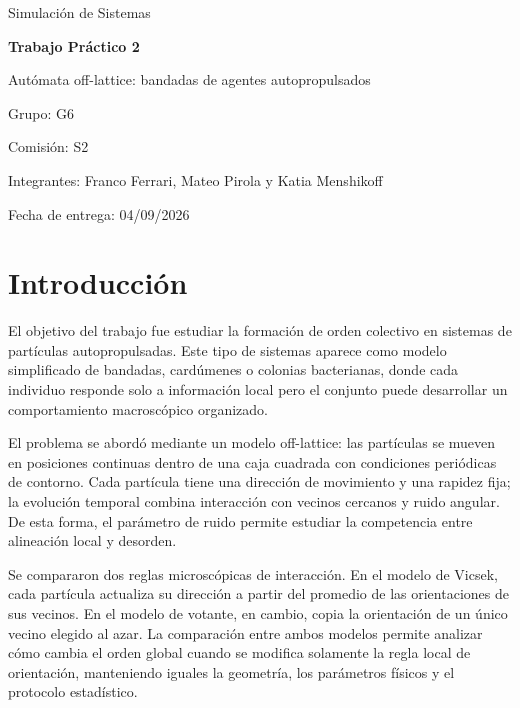 \documentclass[11pt,a4paper]{article}
\begin{document}
\begin{titlepage}
\centering
\vspace*{2cm}
{\Large Simulación de Sistemas\par}
\vspace{0.5cm}
{\LARGE\bfseries Trabajo Práctico 2\par}
\vspace{0.3cm}
{\large Autómata off-lattice: bandadas de agentes autopropulsados\par}
\vspace{2cm}
{\large
Grupo: G6\par
Comisión: S2\par
Integrantes: Franco Ferrari, Mateo Pirola y Katia Menshikoff\par
Fecha de entrega: 04/09/2026\par
}
\vfill
\end{titlepage}

\tableofcontents
\newpage

\section{Introducción}

El objetivo del trabajo fue estudiar la formación de orden colectivo en sistemas de partículas autopropulsadas. Este tipo de sistemas aparece como modelo simplificado de bandadas, cardúmenes o colonias bacterianas, donde cada individuo responde solo a información local pero el conjunto puede desarrollar un comportamiento macroscópico organizado.

El problema se abordó mediante un modelo off-lattice: las partículas se mueven en posiciones continuas dentro de una caja cuadrada con condiciones periódicas de contorno. Cada partícula tiene una dirección de movimiento y una rapidez fija; la evolución temporal combina interacción con vecinos cercanos y ruido angular. De esta forma, el parámetro de ruido permite estudiar la competencia entre alineación local y desorden.

Se compararon dos reglas microscópicas de interacción. En el modelo de Vicsek, cada partícula actualiza su dirección a partir del promedio de las orientaciones de sus vecinos. En el modelo de votante, en cambio, copia la orientación de un único vecino elegido al azar. La comparación entre ambos modelos permite analizar cómo cambia el orden global cuando se modifica solamente la regla local de orientación, manteniendo iguales la geometría, los parámetros físicos y el protocolo estadístico.
\end{document}
